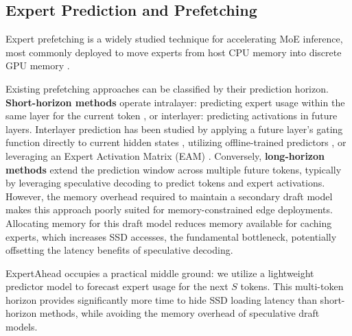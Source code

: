 \subsection{Expert Prediction and Prefetching}
Expert prefetching is a widely studied technique for accelerating MoE inference, most commonly deployed to move experts from host CPU memory into discrete GPU memory \cite{xue2025moeinfinityefficientmoeinference,gavhane2025moebeyondlearningbasedexpertactivation,song2025promoefastmoebasedllm,zhu2025preattentionexpertpredictionprefetching, zhang2025daopdataawareoffloadingpredictive}. 

Existing prefetching approaches can be classified by their prediction horizon. \textbf{Short-horizon methods} operate intralayer: predicting expert usage within the same layer for the current token \cite{zhu2025preattentionexpertpredictionprefetching}, or interlayer: predicting activations in future layers. Interlayer prediction has been studied by applying a future layer's gating function directly to current hidden states \cite{eliseev2023fastinferencemixtureofexpertslanguage, zhu2026daliworkloadawareoffloadingframework, fang2025fatefastedgeinference, yao2024exploitinginterlayerexpertaffinity}, utilizing offline-trained predictors \cite{song2025promoefastmoebasedllm, zhang2026duoservemoedualphaseexpertprefetch, yi2025edgemoeempoweringsparselarge, gavhane2025moebeyondlearningbasedexpertactivation}, or leveraging an Expert Activation Matrix (EAM) \cite{xue2025moeinfinityefficientmoeinference}. Conversely, \textbf{long-horizon methods} extend the prediction window across multiple future tokens, typically by leveraging speculative decoding \cite{wang2025moespeqspeculativequantizeddecoding, chen2025spmoespeculativedecodingprefetching} to predict tokens and expert activations. However, the memory overhead required to maintain a secondary draft model makes this approach poorly suited for memory-constrained edge deployments. Allocating memory for this draft model reduces memory available for caching experts, which increases SSD accesses, the fundamental bottleneck, potentially offsetting the latency benefits of speculative decoding.


ExpertAhead occupies a practical middle ground: we utilize a lightweight predictor model to forecast expert usage for the next $S$ tokens. This multi-token horizon provides significantly more time to hide SSD loading latency than short-horizon methods, while avoiding the memory overhead of speculative draft models.

